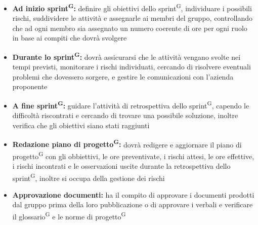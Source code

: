 \documentclass[a4paper, 11pt]{article}
\begin{document}
    \begin{itemize}
        \item \textbf{Ad inizio sprint\textsuperscript{G}:} definire gli obiettivi dello sprint\textsuperscript{G}, individuare i possibili rischi, suddividere le attività 
        e assegnarle ai membri del gruppo, controllando che ad ogni membro sia assegnato un numero coerente di ore per ogni ruolo in base ai compiti che dovrà svolgere
        \item \textbf{Durante lo sprint\textsuperscript{G}:} dovrà assicurarsi che le attività vengano svolte nei tempi previsti, monitorare i rischi individuati, cercando di risolvere 
        eventuali problemi che dovessero sorgere, e gestire le comunicazioni con l'azienda proponente
        \item \textbf{A fine sprint\textsuperscript{G}:} guidare l'attività di retrospettiva dello sprint\textsuperscript{G}, capendo le difficoltà riscontrati e cercando di trovare una possibile soluzione, inoltre
          verifica che gli obiettivi siano stati raggiunti
        \item \textbf{Redazione piano di progetto\textsuperscript{G}:} dovrà redigere e aggiornare il piano di progetto\textsuperscript{G} con gli obbiettivi, le ore preventivate, i rischi attesi, le ore effettive,
          i rischi incontrati e le osservazioni uscite durante la retrospettiva dello sprint\textsuperscript{G}, inoltre si occupa della gestione dei rischi 
        \item \textbf{Approvazione documenti:} ha il compito di approvare i documenti prodotti dal gruppo prima della loro pubblicazione 
        o di approvare i verbali e verificare il glossario\textsuperscript{G} e le norme di progetto\textsuperscript{G} 
    \end{itemize}
\end{document}
